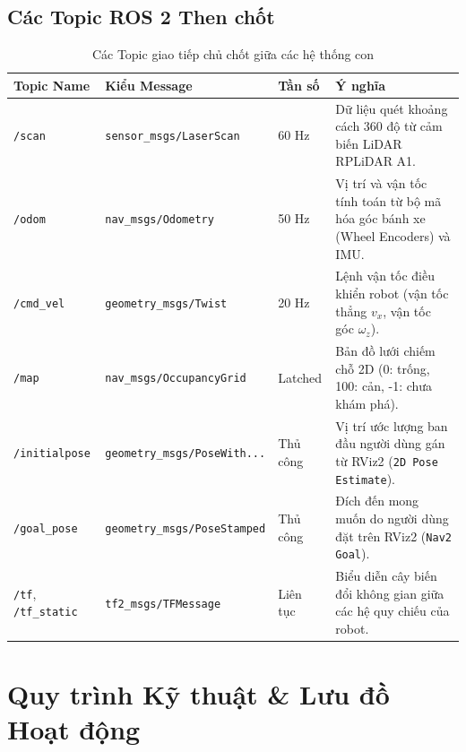\documentclass[12pt, a4paper]{article}
\begin{document}
\subsection{Các Topic ROS 2 Then chốt}
\begin{table}[H]
\centering
\small
\caption{Các Topic giao tiếp chủ chốt giữa các hệ thống con}
\begin{tabularx}{\linewidth}{p{3.2cm}p{3.8cm}p{2.2cm}X}
\toprule
\textbf{Topic Name} & \textbf{Kiểu Message} & \textbf{Tần số} & \textbf{Ý nghĩa} \\
\midrule
\texttt{/scan} & \texttt{sensor\_msgs/LaserScan} & 60 Hz & Dữ liệu quét khoảng cách 360 độ từ cảm biến LiDAR RPLiDAR A1. \\
\texttt{/odom} & \texttt{nav\_msgs/Odometry} & 50 Hz & Vị trí và vận tốc tính toán từ bộ mã hóa góc bánh xe (Wheel Encoders) và IMU. \\
\texttt{/cmd\_vel} & \texttt{geometry\_msgs/Twist} & 20 Hz & Lệnh vận tốc điều khiển robot (vận tốc thẳng $v_x$, vận tốc góc $\omega_z$). \\
\texttt{/map} & \texttt{nav\_msgs/OccupancyGrid} & Latched & Bản đồ lưới chiếm chỗ 2D (0: trống, 100: cản, -1: chưa khám phá). \\
\texttt{/initialpose} & \texttt{geometry\_msgs/PoseWith...} & Thủ công & Vị trí ước lượng ban đầu người dùng gán từ RViz2 (\texttt{2D Pose Estimate}). \\
\texttt{/goal\_pose} & \texttt{geometry\_msgs/PoseStamped} & Thủ công & Đích đến mong muốn do người dùng đặt trên RViz2 (\texttt{Nav2 Goal}). \\
\texttt{/tf}, \texttt{/tf\_static} & \texttt{tf2\_msgs/TFMessage} & Liên tục & Biểu diễn cây biến đổi không gian giữa các hệ quy chiếu của robot. \\
\bottomrule
\end{tabularx}
\end{table}

\newpage
\section{Quy trình Kỹ thuật \& Lưu đồ Hoạt động}
\end{document}
